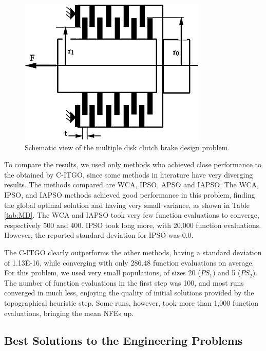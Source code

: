 \begin{figure}[h]
\begin{center}
\includegraphics[scale=0.6]{Imgs/MD.jpg}
\end{center}
\captionsetup{justification=centering}
\caption{Schematic view of the multiple disk clutch brake design problem.}\label{fig:MD}
\end{figure}

To compare the results, we used only methods who achieved close performance to the obtained by C-ITGO, since some methods in literature have very diverging results. The methods compared are WCA, IPSO, APSO and IAPSO. The WCA, IPSO, and IAPSO methods achieved good performance in this problem, finding the global optimal solution and having very small variance, as shown in Table \ref{tab:MD}. The WCA and IAPSO took very few function evaluations to converge, respectively 500 and 400. IPSO took long more, with 20,000 function evaluations. However, the reported standard deviation for IPSO was 0.0.



The C-ITGO clearly outperforms the other methods, having a standard deviation of 1.13E-16, while converging with only 286.48 function evaluations on average. For this problem, we used very small populations, of sizes 20 ($PS_1$) and 5 ($PS_2$). The number of function evaluations in the first step was 100, and most runs converged in much less, enjoying the quality of initial solutions provided by the topographical heuristic step. Some runs, however, took more than 1,000 function evaluations, bringing the mean NFEs up.



\subsection{Best Solutions to the Engineering Problems}

